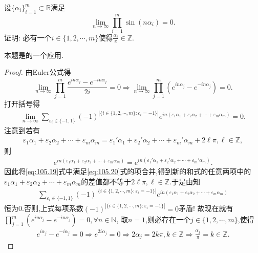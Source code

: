 \documentclass[../../main.tex]{subfiles}
\begin{document}
\begin{example}
设$\{\alpha_i\}_{i=1}^m\subset\mathbb{R}$满足
\[
\lim_{n\to\infty}\prod_{i=1}^m\sin(n\alpha_i)=0.
\]
证明: 必有一个$i\in\{1,2,\cdots,m\}$使得$\frac{\alpha_i}{\pi}\in\mathbb{Z}$.
\end{example}
\begin{note}
本题是的一个应用.
\end{note}
\begin{proof}
由Euler公式得
\[
\lim_{n\to\infty}\prod_{j=1}^m\frac{e^{in\alpha_j}-e^{-in\alpha_j}}{2i}=0\Rightarrow\lim_{n\to\infty}\prod_{j=1}^m(e^{in\alpha_j}-e^{-in\alpha_j})=0.
\]
打开括号得
\begin{align}\label{eq:105.19}
\lim_{n\to\infty}\sum_{\varepsilon_i\in\{-1,1\}}(-1)^{|\{i\in\{1,2,\cdots,m\}:\varepsilon_i=-1\}|}e^{in(\varepsilon_1\alpha_1+\varepsilon_2\alpha_2+\cdots+\varepsilon_m\alpha_m)}=0.
\end{align}
注意到若有
\begin{align}\label{eq:105.20}
\varepsilon _1\alpha _1+\varepsilon _2\alpha _2+\cdots +\varepsilon _m\alpha _m=\varepsilon _1\prime \alpha _1+\varepsilon _2\prime \alpha _2+\cdots +\varepsilon _m\prime \alpha _m+2\ell \pi ,\ell \in \mathbb{Z} ,
\end{align}
则
\begin{align*}
e^{in\left( \varepsilon _1\alpha _1+\varepsilon _2\alpha _2+\cdots +\varepsilon _m\alpha _m \right)}=e^{in\left( \varepsilon _1\prime \alpha _1+\varepsilon _2\prime \alpha _2+\cdots +\varepsilon _m\prime \alpha _m \right)}.
\end{align*}
因此将\eqref{eq:105.19}式中满足\eqref{eq:105.20}式的项合并,得到新的和式的任意两项中的$\varepsilon _1\alpha _1+\varepsilon _2\alpha _2+\cdots +\varepsilon _m\alpha _m$的差值都不等于$2\ell \pi,\ell \in \mathbb{Z}$.于是由知
\begin{align*}
\sum_{\varepsilon_i\in\{-1,1\}}(-1)^{|\{i\in\{1,2,\cdots,m\}:\varepsilon_i=-1\}|}e^{in(\varepsilon_1\alpha_1+\varepsilon_2\alpha_2+\cdots+\varepsilon_m\alpha_m)}
\end{align*}
恒为0.否则,上式每项系数$(-1)^{|\{i\in\{1,2,\cdots,m\}:\varepsilon_i=-1\}|}=0$矛盾!
故现在就有$\prod_{j=1}^m(e^{in\alpha_j}-e^{-in\alpha_j})=0,\forall n\in\mathbb{N}$, 取$n=1$,则必存在一个$j\in\{1,2,\cdots,m\}$,使得
\begin{align*}
e^{i\alpha _j}-e^{-i\alpha _j}=0\Longrightarrow e^{2i\alpha _j}=0\Longrightarrow 2\alpha _j=2k\pi ,k\in \mathbb{Z} \Longrightarrow \frac{\alpha _j}{\pi}=k\in \mathbb{Z} .
\end{align*}

\end{proof}
\end{document}
